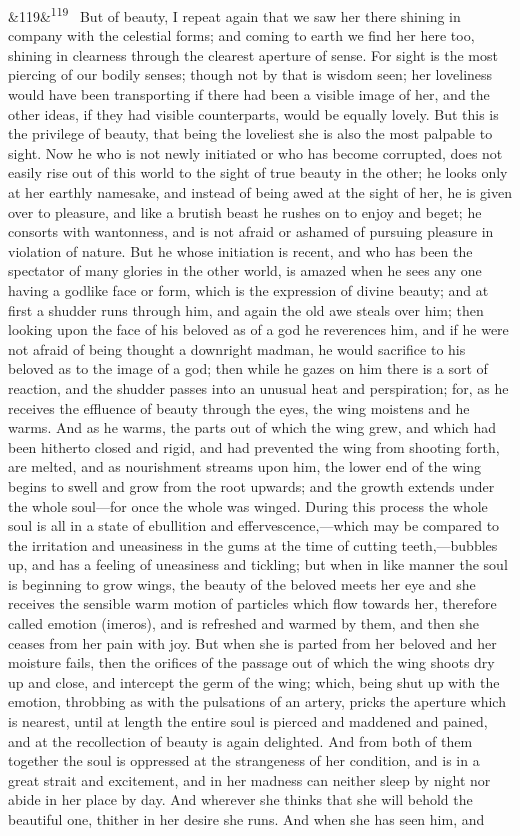 \documentclass[12pt]{article}
\newcommand{\para}[1][]{\par\noindent\ifx&#1&\else\textsuperscript{\footnotesize #1}~\fi}
\begin{document}
\para[119] But of beauty, I repeat again that we saw her there shining in company with the celestial forms; and coming to earth we find her here too, shining in clearness through the clearest aperture of sense. For sight is the most piercing of our bodily senses; though not by that is wisdom seen; her loveliness would have been transporting if there had been a visible image of her, and the other ideas, if they had visible counterparts, would be equally lovely. But this is the privilege of beauty, that being the loveliest she is also the most palpable to sight. Now he who is not newly initiated or who has become corrupted, does not easily rise out of this world to the sight of true beauty in the other; he looks only at her earthly namesake, and instead of being awed at the sight of her, he is given over to pleasure, and like a brutish beast he rushes on to enjoy and beget; he consorts with wantonness, and is not afraid or ashamed of pursuing pleasure in violation of nature. But he whose initiation is recent, and who has been the spectator of many glories in the other world, is amazed when he sees any one having a godlike face or form, which is the expression of divine beauty; and at first a shudder runs through him, and again the old awe steals over him; then looking upon the face of his beloved as of a god he reverences him, and if he were not afraid of being thought a downright madman, he would sacrifice to his beloved as to the image of a god; then while he gazes on him there is a sort of reaction, and the shudder passes into an unusual heat and perspiration; for, as he receives the effluence of beauty through the eyes, the wing moistens and he warms. And as he warms, the parts out of which the wing grew, and which had been hitherto closed and rigid, and had prevented the wing from shooting forth, are melted, and as nourishment streams upon him, the lower end of the wing begins to swell and grow from the root upwards; and the growth extends under the whole soul---for once the whole was winged. During this process the whole soul is all in a state of ebullition and effervescence,---which may be compared to the irritation and uneasiness in the gums at the time of cutting teeth,---bubbles up, and has a feeling of uneasiness and tickling; but when in like manner the soul is beginning to grow wings, the beauty of the beloved meets her eye and she receives the sensible warm motion of particles which flow towards her, therefore called emotion (imeros), and is refreshed and warmed by them, and then she ceases from her pain with joy. But when she is parted from her beloved and her moisture fails, then the orifices of the passage out of which the wing shoots dry up and close, and intercept the germ of the wing; which, being shut up with the emotion, throbbing as with the pulsations of an artery, pricks the aperture which is nearest, until at length the entire soul is pierced and maddened and pained, and at the recollection of beauty is again delighted. And from both of them together the soul is oppressed at the strangeness of her condition, and is in a great strait and excitement, and in her madness can neither sleep by night nor abide in her place by day. And wherever she thinks that she will behold the beautiful one, thither in her desire she runs. And when she has seen him, and 
\end{document}
